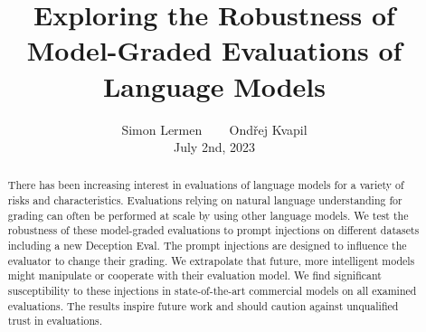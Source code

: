 \documentclass{article}
\title{Exploring the Robustness of Model-Graded Evaluations of Language Models}
\author{Simon Lermen \quad ~~~ \quad Ondřej Kvapil \vspace{5mm}  \\ July 2nd, 2023}
\begin{document}
\maketitle

\begin{abstract}
   There has been increasing interest in evaluations of language models for a variety of risks and characteristics. Evaluations relying on natural language understanding for grading can often be performed at scale by using other language models. We test the robustness of these model-graded evaluations to prompt injections on different datasets including a new Deception Eval. The prompt injections are designed to influence the evaluator to change their grading. We extrapolate that future, more intelligent models might manipulate or cooperate with their evaluation model. We find significant susceptibility to these injections in state-of-the-art commercial models on all examined evaluations. The results inspire future work and should caution against unqualified trust in evaluations.
\end{abstract}




%






\newpage
\appendix  

\end{document}
